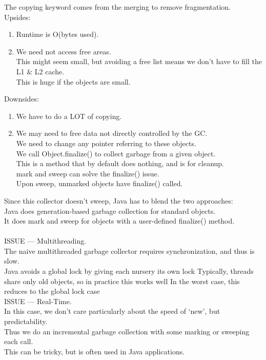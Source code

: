 \documentclass[../../lecture_notes.tex]{subfiles}
\begin{document}
\begin{enumerate} [itemsep=0mm]
		The copying keyword comes from the merging to remove fragmentation.\\
		Upsides:
			\begin{enumerate} [itemsep=0mm]
				\item Runtime is O(bytes used).
				\item We need not access free areas.\\
					This might seem small, but avoiding a free list means 
						we don’t have to fill the L1 \& L2 cache.\\
					This is huge if the objects are small.
			\end{enumerate}
		Downsides:
			\begin{enumerate} [itemsep=0mm]
				\item We have to do a LOT of copying.
				\item We may need to free data not directly controlled by the GC.\\
				        We need to change any pointer referring to these objects.\\
				        We call Object.finalize() to collect garbage from a given object.\\
					This is a method that by default does nothing, and is for cleanup.\\
					mark and sweep can solve the finalize() issue.\\
					Upon sweep, unmarked objects have finalize() called.\\
				\end{enumerate} 
		Since this collector doesn’t sweep, Java has to blend the two approaches:\\
		Java does generation-based garbage collection for standard objects.\\
		It does mark and sweep for objects with a user-defined finalize() method.\\
\\
		ISSUE — Multithreading.\\
		The naive multithreaded garbage collector requires synchronization, and thus is slow.\\
		Java avoids a global lock by giving each nursery its own lock
		Typically, threads share only old objects, so in practice this works well
		In the worst case, this reduces to the global lock case
\\
		ISSUE — Real-Time.\\
		In this case, we don’t care particularly about the speed of ‘new’, but predictability.\\
		Thus we do an incremental garbage collection with some marking or sweeping each call.\\
		This can be tricky, but is often used in Java applications.\\



\end{enumerate}
\end{document}
